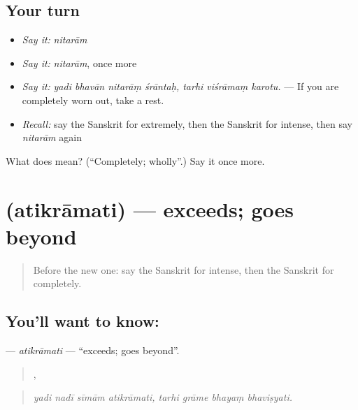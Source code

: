 \subsection*{Your turn}
\begin{itemize}
\raggedright
  \item \emph{Say it:} \emph{nitarām}
  \item \emph{Say it:} \emph{nitarām}, once more
  \item \emph{Say it:} \emph{yadi bhavān nitarāṃ śrāntaḥ, tarhi viśrāmaṃ karotu.} — If you are completely worn out, take a rest.
  \item \emph{Recall:} say the Sanskrit for extremely, then the Sanskrit for intense, then say \emph{nitarām} again
\end{itemize}

\begin{tcolorbox}[breakable,colback=teal!4,colframe=teal!35!black,title={Before you move on}]
What does  mean? (\textquotedblleft{}Completely; wholly\textquotedblright{}.) Say it once more.
\end{tcolorbox}
\section[\texorpdfstring{\sk{अतिक्रामति} (atikrāmati)}{अतिक्रामति (atikrāmati)}]{ (atikrāmati) — exceeds; goes beyond}

\label{lesson:SA-C377-atikramati}



\begin{quote}
Before the new one: say the Sanskrit for intense, then the Sanskrit for completely.
\end{quote}

\subsection*{You'll want to know: }
\textbf{} — \emph{atikrāmati} — \textquotedblleft{}exceeds; goes beyond\textquotedblright{}.

\begin{quote}
   ,    
\end{quote}

\begin{quote}
\emph{yadi nadī sīmām atikrāmati, tarhi grāme bhayaṃ bhaviṣyati.}
\end{quote}

